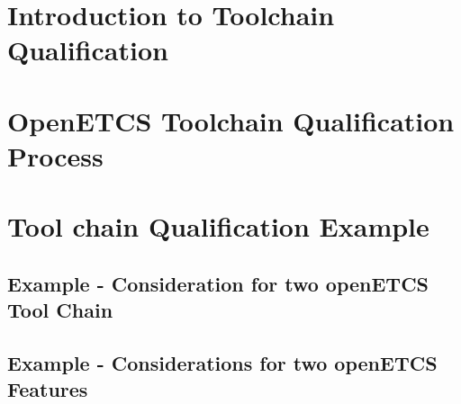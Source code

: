 \documentclass{openetcs_report}
\begin{document}
\mainmatter







\chapter{Introduction to Toolchain Qualification}
\label{chap:introduction-and-sota}




\chapter{OpenETCS Toolchain Qualification Process}
\label{chap:qualification-process}


\chapter{Tool chain Qualification Example}
\section{Example - Consideration for two openETCS Tool Chain}

\section{Example - Considerations for two openETCS Features}
\label{chap:examples}




\end{document}

